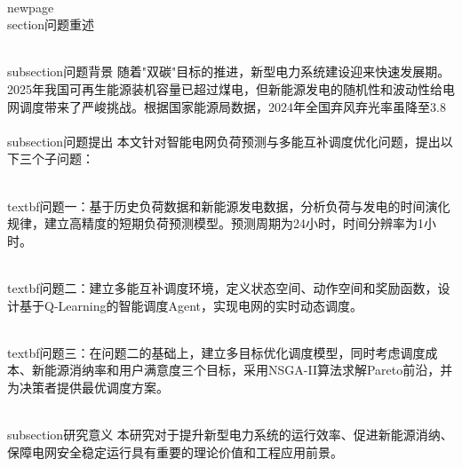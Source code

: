 \\newpage
\\section{问题重述}

\\subsection{问题背景}
随着"双碳"目标的推进，新型电力系统建设迎来快速发展期。2025年我国可再生能源装机容量已超过煤电，但新能源发电的随机性和波动性给电网调度带来了严峻挑战。根据国家能源局数据，2024年全国弃风弃光率虽降至3.8\\%

\\subsection{问题提出}
本文针对智能电网负荷预测与多能互补调度优化问题，提出以下三个子问题：

\\textbf{问题一}：基于历史负荷数据和新能源发电数据，分析负荷与发电的时间演化规律，建立高精度的短期负荷预测模型。预测周期为24小时，时间分辨率为1小时。

\\textbf{问题二}：建立多能互补调度环境，定义状态空间、动作空间和奖励函数，设计基于Q-Learning的智能调度Agent，实现电网的实时动态调度。

\\textbf{问题三}：在问题二的基础上，建立多目标优化调度模型，同时考虑调度成本、新能源消纳率和用户满意度三个目标，采用NSGA-II算法求解Pareto前沿，并为决策者提供最优调度方案。

\\subsection{研究意义}
本研究对于提升新型电力系统的运行效率、促进新能源消纳、保障电网安全稳定运行具有重要的理论价值和工程应用前景。
